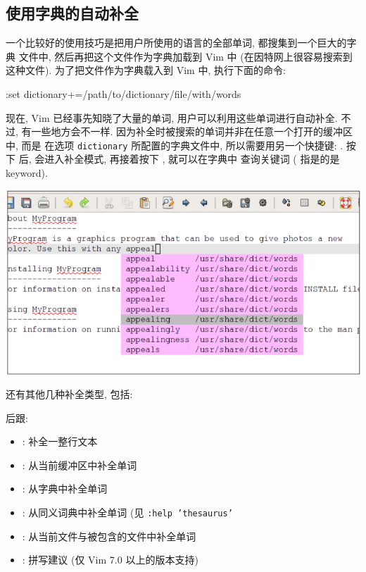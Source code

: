 \subsection{使用字典的自动补全}
\label{subsec:autocompletion_using_dictionary_lookup}

一个比较好的使用技巧是把用户所使用的语言的全部单词, 都搜集到一个巨大的字典
文件中, 然后再把这个文件作为字典加载到 Vim 中 (在因特网上很容易搜索到这种文件).
为了把文件作为字典载入到 Vim 中, 执行下面的命令:
\begin{vimcode}
:set dictionary+=/path/to/dictionary/file/with/words
\end{vimcode}
现在, Vim 已经事先知晓了大量的单词, 用户可以利用这些单词进行自动补全. 不过,
有一些地方会不一样. 因为补全时被搜索的单词并非在任意一个打开的缓冲区中, 而是 
在选项 \texttt{dictionary} 所配置的字典文件中, 所以需要用另一个快捷键:
.
按下  后, 会进入补全模式, 再接着按下 , 就可以在字典中
查询关键词 ( 指是的是 keyword).
\begin{center}
    \includegraphics[scale=0.6]{./images/page86.png}
\end{center}

还有其他几种补全类型, 包括:

 后跟:
\begin{itemize}
    \item {}: 补全一整行文本
    \item {}: 从当前缓冲区中补全单词
    \item {}: 从字典中补全单词
    \item {}: 从同义词典中补全单词 (见 \texttt{:help 'thesaurus'}
    \item {}: 从当前文件与被包含的文件中补全单词
    \item {}: 拼写建议 (仅 Vim 7.0 以上的版本支持)
\end{itemize}

